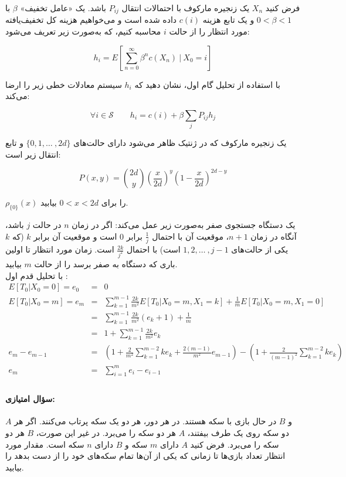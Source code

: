 \documentclass[11pt, a4, twoside]{article}
\begin{document}
	\begin{problem} %
    فرض کنید $X_n$ یک زنجیره مارکوف با احتمالات انتقال $P_{ij}$ باشد. یک «عامل تخفیف» $\beta$ با $0 < \beta < 1$ و یک تابع هزینه $c(i)$ داده شده است و می‌خواهیم هزینه کل تخفیف‌یافته مورد انتظار را از حالت $i$ محاسبه کنیم، که به‌صورت زیر تعریف می‌شود:
    
    \[
    h_i = E\left[\sum_{n=0}^{\infty} \beta^n c(X_n) \ | \ X_0 = i\right]
    \]
    
    با استفاده از تحلیل گام اول، نشان دهید که $h_i$ سیستم معادلات خطی زیر را ارضا می‌کند:
    
    \[
    \forall i \in \mathcal{S} \qquad h_i = c(i) + \beta \sum_j P_{ij} h_j
    \] 

	\end{problem}

	\begin{problem} %
    یک زنجیره مارکوف که در ژنتیک ظاهر می‌شود دارای حالت‌های $\{0, 1, \dots\ , 2d\}$ و تابع انتقال زیر است:
    
    \[
    P(x,y) = \binom{2d}{y}\left(\frac{x}{2d}\right)^y\left(1 - \frac{x}{2d}\right)^{2d-y}
    \]
    
    $\rho_{\{0\}}(x)$ را برای $0 < x < 2d$ بیابید.

	\end{problem}

	\begin{problem} %
    یک دستگاه جستجوی صفر به‌صورت زیر عمل می‌کند: اگر در زمان $n$ در حالت $j$ باشد، آنگاه در زمان $n + 1$، موقعیت آن با احتمال $\frac{1}{j}$ برابر $0$ است و موقعیت آن برابر $k$ (که $k$ یکی از حالت‌های $1, 2, \dots\ , j - 1$ است) با احتمال $\frac{2k}{j^2}$ است. زمان مورد انتظار تا اولین باری که دستگاه به صفر برسد را از حالت $m$ بیابید. \\
	{\color{blue}
	با تحلیل قدم اول :
	\begin{eqnarray*}
		E[T_0 | X_0 = 0] = e_0 &=& 0 \\
		E[T_0 | X_0 = m] = e_m &=& \sum_{k=1}^{m-1} \frac{2k}{m^2} E[T_0 | X_0 = m, X_1 = k] + \frac{1}{m} E[T_0 | X_0 = m, X_1 = 0] \\
		&=& \sum_{k=1}^{m-1} \frac{2k}{m^2} \left(e_{k} + 1 \right) + \frac{1}{m} \\
		&=& 1 + \sum_{k=1}^{m-1} \frac{2k}{m^2} e_k \\
		e_m - e_{m-1} &=& \left(1 + \frac{2}{m^2} \sum_{k=1}^{m-2} k e_k + \frac{2(m-1)}{m^2}e_{m-1}\right) - \left(1  + \frac{2}{(m-1)^2} \sum_{k=1}^{m-2} k e_k\right) \\
		e_m &=& \sum_{i=1}^m e_i - e_{i-1} \\
	\end{eqnarray*}
	}
	\end{problem}

\paragraph{\textbf{سؤال امتیازی:}} $A$ و $B$ در حال بازی با سکه هستند. در هر دور، هر دو یک سکه پرتاب می‌کنند. اگر هر دو سکه روی یک طرف بیفتند، $A$ هر دو سکه را می‌برد. در غیر این صورت، $B$ هر دو سکه را می‌برد. فرض کنید $A$ دارای $m$ سکه و $B$ دارای $n$ سکه است. مقدار مورد انتظار تعداد بازی‌ها تا زمانی که یکی از آن‌ها تمام سکه‌های خود را از دست بدهد را بیابید.
\end{document}
